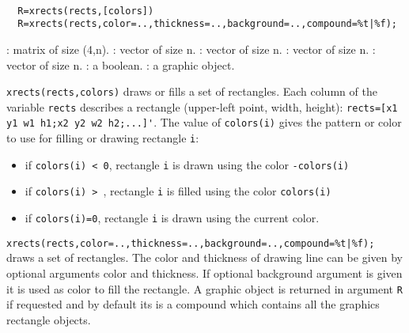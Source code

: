 
\begin{mandesc}
  \\ %
\end{mandesc}
\begin{calling_sequence}
\begin{verbatim}
  R=xrects(rects,[colors])
  R=xrects(rects,color=..,thickness=..,background=..,compound=%t|%f);
\end{verbatim}
\end{calling_sequence}

\begin{parameters}
  \begin{varlist}
    : matrix of size (4,n).
    : vector of size n.
    : vector of size n.
    : vector of size n.
    : vector of size n.
    : a boolean.
    : a graphic object.
  \end{varlist}
\end{parameters}

\begin{mandescription}
  \verb!xrects(rects,colors)! draws or fills a set of rectangles.
  Each column of the variable \verb!rects! describes a rectangle
  (upper-left point, width, height): \verb!rects=[x1 y1 w1 h1;x2 y2 w2 h2;...]'!.
  The value of \verb!colors(i)! gives the pattern or color to use for filling or drawing rectangle
  \verb!i!:
  \begin{itemize}
  \item if \verb!colors(i) < 0!, rectangle \verb!i! is drawn using the color \verb!-colors(i)!
  \item if \verb!colors(i) > !, rectangle \verb!i! is filled using the color \verb!colors(i)!
  \item if \verb!colors(i)=0!, rectangle \verb!i! is drawn using the current color.
  \end{itemize}

  \verb!xrects(rects,color=..,thickness=..,background=..,compound=%t|%f);! draws a set of
  rectangles. The color and thickness of drawing line can be given by optional arguments
  color and thickness. If optional background argument is given it is used as color to fill
  the rectangle. A graphic object is returned in argument \verb!R! if requested and by default
  its is a compound which contains all the graphics rectangle objects.

\end{mandescription}

